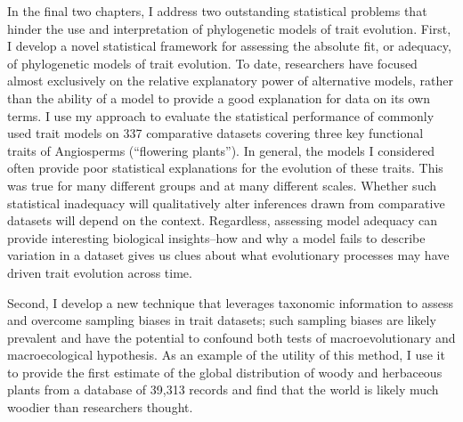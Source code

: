 In the final two chapters, I address two outstanding statistical problems that hinder the use and interpretation of phylogenetic models of trait evolution. First, I develop a novel statistical framework for assessing the absolute fit, or adequacy, of phylogenetic models of trait evolution. To date, researchers have focused almost exclusively on the relative explanatory power of alternative models, rather than the ability of a model to provide a good explanation for data on its own terms. I use my approach to evaluate the statistical performance of commonly used trait models on 337 comparative datasets covering three key functional traits of Angiosperms (``flowering plants''). In general, the models I considered often provide poor statistical explanations for the evolution of these traits. This was true for many different groups and at many different scales.  Whether such statistical inadequacy will qualitatively alter inferences drawn from comparative datasets will depend on the context. Regardless, assessing model adequacy can provide interesting biological insights--how and why a model fails to describe variation in a dataset gives us clues about what evolutionary processes may have driven trait evolution across time.

Second, I develop a new technique that leverages taxonomic information to assess and overcome sampling biases in trait datasets; such sampling biases are likely prevalent and have the potential to confound both tests of macroevolutionary and macroecological hypothesis. As an example of the utility of this method, I use it to provide the first estimate of the global distribution of woody and herbaceous plants from a database of 39,313 records and find that the world is likely much woodier than researchers thought. 


